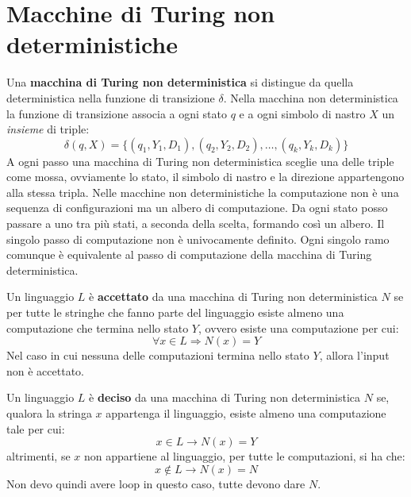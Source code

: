 \section{Macchine di Turing non deterministiche}
Una \textbf{macchina di Turing non deterministica} si distingue da quella
deterministica nella funzione di transizione $\delta$. Nella macchina non
deterministica la funzione di transizione associa a ogni stato $q$ e a ogni simbolo
di nastro $X$ un \textit{insieme} di triple:
\begin{equation}
    \delta(q, X) = \{(q_1, Y_1, D_1), (q_2, Y_2, D_2), \dots, (q_k, Y_k, D_k)\}
\end{equation}
A ogni passo una macchina di Turing non deterministica sceglie una delle triple
come mossa, ovviamente lo stato, il simbolo di nastro e la direzione appartengono
alla stessa tripla. Nelle macchine non deterministiche la computazione non è una
sequenza di configurazioni ma un albero di computazione. Da ogni stato posso passare
a uno tra più stati, a seconda della scelta, formando così un albero. Il singolo
passo di computazione non è univocamente definito. Ogni singolo ramo comunque è
equivalente al passo di computazione della macchina di Turing deterministica.
\begin{definizione}
    Un linguaggio $L$ è \textbf{accettato} da una macchina di Turing non
    deterministica $N$ se per tutte le stringhe che fanno parte del linguaggio
    esiste almeno una computazione che termina nello stato $Y$, ovvero esiste una
    computazione per cui:
    \begin{equation}
        \forall x \in L \Rightarrow N(x) = Y
    \end{equation}
    Nel caso in cui nessuna delle computazioni termina nello stato $Y$, allora
    l'input non è accettato.
\end{definizione}
\begin{definizione}
    Un linguaggio $L$ è \textbf{deciso} da una macchina di Turing non deterministica
    $N$ se, qualora la stringa $x$ appartenga il linguaggio, esiste almeno una
    computazione tale per cui:
    \begin{equation}
        x \in L \to N(x) = Y
    \end{equation}
    altrimenti, se $x$ non appartiene al linguaggio, per tutte le computazioni, si ha che:
    \begin{equation}
        x \not\in L \to N(x) = N
    \end{equation}
    Non devo quindi avere loop in questo caso, tutte devono dare $N$.
\end{definizione}
